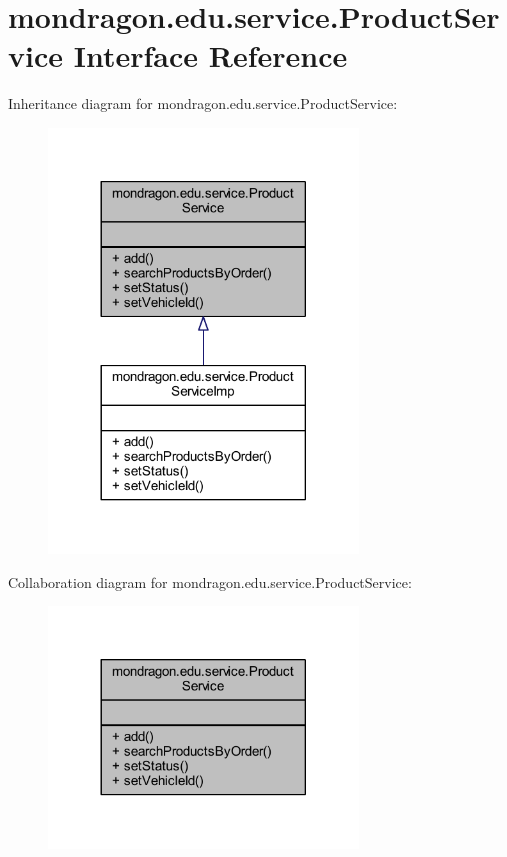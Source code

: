 \hypertarget{interfacemondragon_1_1edu_1_1service_1_1_product_service}{}\section{mondragon.\+edu.\+service.\+Product\+Service Interface Reference}
\label{interfacemondragon_1_1edu_1_1service_1_1_product_service}


Inheritance diagram for mondragon.\+edu.\+service.\+Product\+Service\+:\nopagebreak
\begin{figure}[H]
\begin{center}
\leavevmode
\includegraphics[width=233pt]{interfacemondragon_1_1edu_1_1service_1_1_product_service__inherit__graph}
\end{center}
\end{figure}


Collaboration diagram for mondragon.\+edu.\+service.\+Product\+Service\+:\nopagebreak
\begin{figure}[H]
\begin{center}
\leavevmode
\includegraphics[width=233pt]{interfacemondragon_1_1edu_1_1service_1_1_product_service__coll__graph}
\end{center}
\end{figure}
